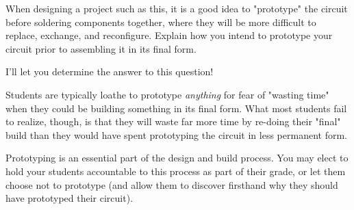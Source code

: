

When designing a project such as this, it is a good idea to "prototype" the circuit before soldering components together, where they will be more difficult to replace, exchange, and reconfigure.  Explain how you intend to prototype your circuit prior to assembling it in its final form.







I'll let you determine the answer to this question!







Students are typically loathe to prototype {\it anything} for fear of "wasting time" when they could be building something in its final form.  What most students fail to realize, though, is that they will waste far more time by re-doing their "final" build than they would have spent prototyping the circuit in less permanent form.

Prototyping is an essential part of the design and build process.  You may elect to hold your students accountable to this process as part of their grade, or let them choose not to prototype (and allow them to discover firsthand why they should have prototyped their circuit).



